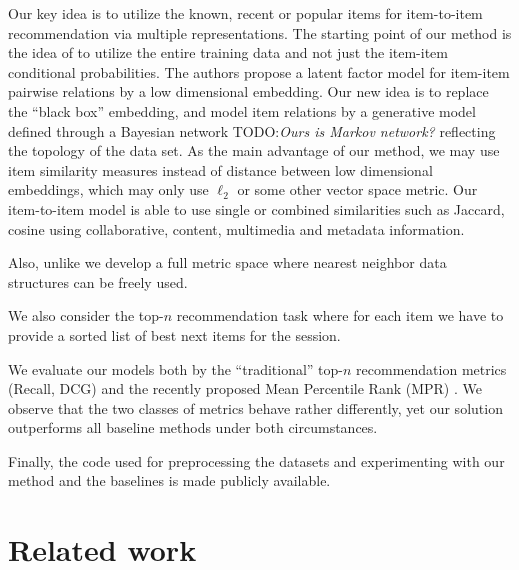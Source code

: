 Our key idea is to utilize the known, recent or popular items for item-to-item recommendation via multiple representations. The starting point of our method is the idea of \cite{koenigstein2013towards} to utilize the entire training data and not just the item-item conditional probabilities.
The authors propose a latent factor model for item-item pairwise relations by a low dimensional embedding.
Our new idea is to replace the ``black box'' embedding, and model item relations by a generative model defined through a Bayesian network TODO:\textit{Ours is Markov network?} reflecting the topology of the data set.  
As the main advantage of our method, we may use item similarity measures instead of distance between low dimensional embeddings, which may only use $\ell_2$ or some other vector space metric. 
Our item-to-item model is able to use single or combined similarities such as Jaccard, cosine using collaborative, content, multimedia and metadata information.

Also, unlike \cite{koenigstein2013towards} 
we develop a full metric space where nearest neighbor data structures can be freely used.

We also consider the top-$n$ recommendation task \cite{deshpande2004item} where for each item we have to provide a sorted list of best next items for the session.

We evaluate our models both by the ``traditional'' top-$n$ recommendation metrics (Recall, DCG) and the recently proposed Mean Percentile Rank (MPR) \cite{hu2008collaborative}.
We observe that the two classes of metrics behave rather differently, yet our solution outperforms all baseline methods under both circumstances.

Finally, the code used for preprocessing the datasets and experimenting with our method and the baselines is made publicly available.



\section{Related work}

